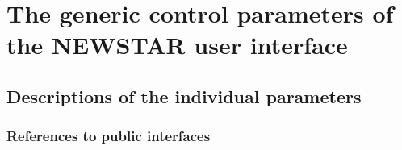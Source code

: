 

\chapter{ The generic control parameters of the NEWSTAR user interface}

\tableofcontents


\section{ Descriptions of the individual parameters}
\label{.descriptions}

\subsection{ References to public interfaces}
\label{.public}

